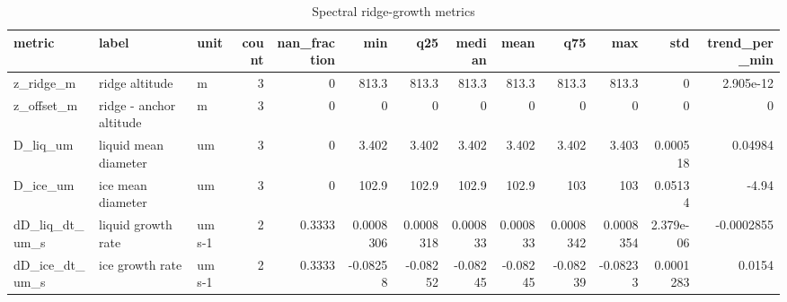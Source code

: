 \begin{table}[htbp]
\centering
\small
\caption{Spectral ridge-growth metrics}
\label{tab:growth_bundle_metrics}
\begin{tabular}{lllrrrrrrrrrr}
\toprule
metric & label & unit & count & nan\_fraction & min & q25 & median & mean & q75 & max & std & trend\_per\_min \\
\midrule
z\_ridge\_m & ridge altitude & m & 3 & 0 & 813.3 & 813.3 & 813.3 & 813.3 & 813.3 & 813.3 & 0 & 2.905e-12 \\
z\_offset\_m & ridge - anchor altitude & m & 3 & 0 & 0 & 0 & 0 & 0 & 0 & 0 & 0 & 0 \\
D\_liq\_um & liquid mean diameter & um & 3 & 0 & 3.402 & 3.402 & 3.402 & 3.402 & 3.402 & 3.403 & 0.000518 & 0.04984 \\
D\_ice\_um & ice mean diameter & um & 3 & 0 & 102.9 & 102.9 & 102.9 & 102.9 & 103 & 103 & 0.05134 & -4.94 \\
dD\_liq\_dt\_um\_s & liquid growth rate & um s-1 & 2 & 0.3333 & 0.0008306 & 0.0008318 & 0.000833 & 0.000833 & 0.0008342 & 0.0008354 & 2.379e-06 & -0.0002855 \\
dD\_ice\_dt\_um\_s & ice growth rate & um s-1 & 2 & 0.3333 & -0.08258 & -0.08252 & -0.08245 & -0.08245 & -0.08239 & -0.08233 & 0.0001283 & 0.0154 \\
\bottomrule
\end{tabular}

\end{table}
